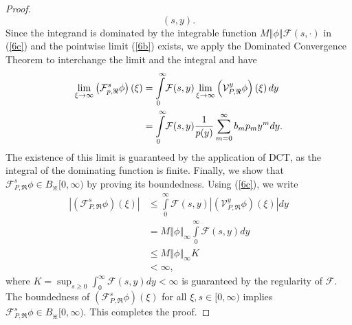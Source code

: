 \documentclass{amsart}
\theoremstyle{plain}
\numberwithin{equation}{section}
\begin{document}
\begin{proof}
\begin{equation}
(s,y).\label{6c}%
\end{equation}
Since the integrand is dominated by the integrable function $M\left \Vert
\phi \right \Vert \mathcal{F}(s,\cdot)$ in (\ref{6c}) and the pointwise limit
(\ref{6b}) exists, we apply the Dominated Convergence Theorem to interchange
the limit and the integral and have
\begin{align}
\lim_{\xi \rightarrow \infty}\left(  \mathcal{%
\mathcal{F}%
}_{p,\Re}^{s}\phi \right)  (\xi) &  =%
{\displaystyle \int \limits_{0}^{\infty}}
\mathcal{F}%
(s,y)\lim_{\xi \rightarrow \infty}\left(  \mathcal{V}_{P,\Re}^{y}\phi \right)
\left(  \xi \right)  dy\nonumber \\
&  =%
{\displaystyle \int \limits_{0}^{\infty}}
\mathcal{%
\mathcal{F}%
}(s,y)\frac{1}{p(y)}\sum_{m=0}^{\infty}b_{m}p_{m}y^{m}dy.\label{101}%
\end{align}
The existence of this limit is guaranteed by the application of DCT, as the
integral of the dominating function is finite. Finally, we show that
$\mathcal{F}_{P,\Re}^{s}\phi \in B_{\divideontimes}[0,\infty)$ by proving its
boundedness. Using (\ref{6c}), we write
\begin{align*}
\left \vert \left(
\mathcal{F}%
_{P,\Re}^{s}\phi \right)  (\xi)\right \vert  &  \leq%
{\displaystyle \int \limits_{0}^{\infty}}
\mathcal{F}%
(s,y)\left \vert \left(  \mathcal{V}_{P,\Re}^{y}\phi \right)  \left(
\xi \right)  \right \vert dy\\
&  =M\left \Vert \phi \right \Vert _{\infty}%
{\displaystyle \int \limits_{0}^{\infty}}
\mathcal{F}%
(s,y)dy\\
&  \leq M\left \Vert \phi \right \Vert _{\infty}K\\
&  <\infty \text{,}%
\end{align*}
where $K=\displaystyle \sup_{s\geq0}\displaystyle \int_{0}^{\infty}%
\mathcal{F}(s,y)dy<\infty$ is guaranteed by the regularity of $\mathcal{F}$.
The boundedness of $\left(  \mathcal{F}_{P,\Re}^{s}\phi \right)  (\xi)$ for all
$\xi,s\in \lbrack0,\infty)$ implies $\mathcal{F}_{P,\Re}^{s}\phi \in
B_{\divideontimes}[0,\infty)$. This completes the proof.
\end{proof}
\end{document}
